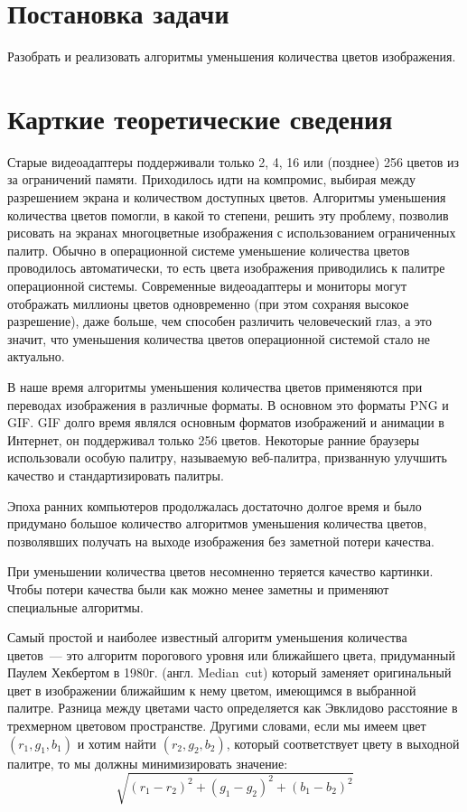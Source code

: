 \newpage
\section{Постановка задачи}
Разобрать и реализовать алгоритмы уменьшения количества цветов изображения.

\section{Карткие теоретические сведения}
Старые видеоадаптеры поддерживали только 2, 4, 16 или (позднее) 256 цветов из за ограничений памяти. Приходилось идти на компромис, выбирая между разрешением экрана и количеством доступных цветов. Алгоритмы уменьшения количества цветов помогли, в какой то степени, решить эту проблему, позволив рисовать на экранах многоцветные изображения с использованием ограниченных палитр. Обычно в операционной системе уменьшение количества цветов проводилось автоматически, то есть цвета изображения приводились к палитре операционной системы. Современные видеоадаптеры и мониторы могут отображать миллионы цветов одновременно (при этом сохраняя высокое разрешение), даже больше, чем способен различить человеческий глаз, а это значит, что уменьшения количества цветов операционной системой стало не актуально.

В наше время алгоритмы уменьшения количества цветов применяются при переводах изображения в различные форматы. В основном это форматы PNG и GIF. GIF долго время являлся основным форматов изображений и анимации в Интернет, он поддерживал только 256 цветов. Некоторые ранние браузеры использовали особую палитру, называемую веб-палитра, призванную улучшить качество и стандартизировать палитры.

Эпоха ранних компьютеров продолжалась достаточно долгое время и было придумано большое количество алгоритмов уменьшения количества цветов, позволявших получать на выходе изображения без заметной потери качества.

При уменьшении количества цветов несомненно теряется качество картинки. Чтобы потери качества были как можно менее заметны и применяют специальные алгоритмы.

Самый простой и наиболее известный алгоритм уменьшения количества цветов~--- это алгоритм порогового уровня или ближайшего цвета, придуманный Паулем Хекбертом в 1980г. (англ. Median~cut) который заменяет оригинальный цвет в изображении ближайшим к нему цветом, имеющимся в выбранной палитре. Разница между цветами часто определяется как Эвклидово расстояние в трехмерном цветовом пространстве. Другими словами, если мы имеем цвет $(r_1, g_1, b_1)$ и хотим найти $(r_2, g_2, b_2)$, который соответствует цвету в выходной палитре, то мы должны минимизировать значение:
$$
    \sqrt{(r_1-r_2)^2 + (g_1-g_2)^2 + (b_1-b_2)^2}
$$


